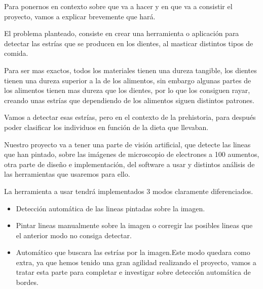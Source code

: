 
Para ponernos en contexto sobre que va a hacer y en que va a consistir el proyecto, vamos a explicar brevemente que hará.

El problema planteado, consiste en crear una herramienta o aplicación para detectar las estrías que se producen en los dientes, al masticar distintos tipos de comida.

Para ser mas exactos, todos los materiales tienen una dureza tangible, los dientes tienen una dureza superior a la de los alimentos, sin embargo  algunas partes de los alimentos tienen mas dureza que los dientes, por lo que los consiguen rayar, creando unas estrías que dependiendo de los alimentos siguen distintos patrones.

 
Vamos a detectar esas estrías, pero en el contexto de la prehistoria, para después poder clasificar los individuos en función de la dieta que llevaban.

Nuestro proyecto va a tener una parte de visión artificial, que detecte las lineas que han pintado, sobre las imágenes de microscopio de electrones a 100 aumentos, otra parte de diseño e implementación, del software a usar y distintos análisis de las herramientas que usaremos para ello.

La herramienta a usar tendrá implementados 3 modos claramente diferenciados.

\begin{itemize}
\item Detección automática de las lineas pintadas sobre la imagen.
\item Pintar lineas manualmente sobre la imagen o corregir las posibles lineas que el anterior modo no consiga detectar.
\item Automático que buscara las estrías por la imagen.Este modo quedara como extra, ya que hemos tenido una gran agilidad realizando el proyecto, vamos a tratar esta parte para completar e investigar sobre detección automática de bordes.
\end{itemize}








 